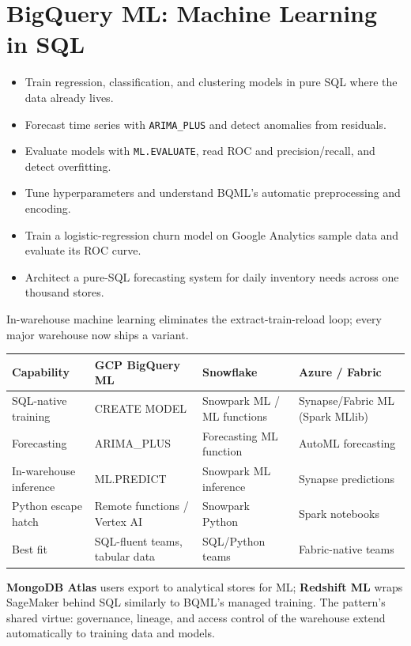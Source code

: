 \chapter{BigQuery ML: Machine Learning in SQL}

\begin{objectives}
\begin{itemize}
    \item Train regression, classification, and clustering models in pure SQL where the data already lives.
    \item Forecast time series with \texttt{ARIMA\_PLUS} and detect anomalies from residuals.
    \item Evaluate models with \texttt{ML.EVALUATE}, read ROC and precision/recall, and detect overfitting.
    \item Tune hyperparameters and understand BQML's automatic preprocessing and encoding.
    \item Train a logistic-regression churn model on Google Analytics sample data and evaluate its ROC curve.
    \item Architect a pure-SQL forecasting system for daily inventory needs across one thousand stores.
\end{itemize}
\end{objectives}

\begin{crosscloud}
In-warehouse machine learning eliminates the extract-train-reload loop; every major warehouse now ships a variant.

\vspace{2mm}
{\footnotesize
\begin{tabular}{@{}p{2.8cm}p{3.0cm}p{3.0cm}p{3.0cm}@{}} \\
\toprule
\textbf{Capability} & \textbf{GCP BigQuery ML} & \textbf{Snowflake} & \textbf{Azure / Fabric} \\
\midrule
SQL-native training & CREATE MODEL & Snowpark ML / ML functions & Synapse/Fabric ML (Spark MLlib) \\
Forecasting & ARIMA\_PLUS & Forecasting ML function & AutoML forecasting \\
In-warehouse inference & ML.PREDICT & Snowpark ML inference & Synapse predictions \\
Python escape hatch & Remote functions / Vertex AI & Snowpark Python & Spark notebooks \\
Best fit & SQL-fluent teams, tabular data & SQL/Python teams & Fabric-native teams \\
\bottomrule
\end{tabular}}

\vspace{1mm}
\textbf{MongoDB Atlas} users export to analytical stores for ML; \textbf{Redshift ML} wraps SageMaker behind SQL similarly to BQML's managed training. The pattern's shared virtue: governance, lineage, and access control of the warehouse extend automatically to training data and models.
\end{crosscloud}

